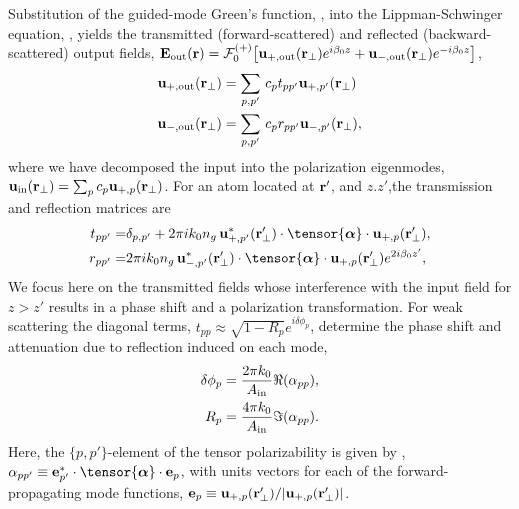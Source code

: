 \documentclass[preprint,aps,pra,onecolumn]{revtex4-1} %
\newcommand{\out}{{\rm out}}
\newcommand{\fwd}{+}
\newcommand{\bwd}{-}
\newcommand{\trans}{+}
\newcommand{\refl}{-}
\newcommand{\Eamp}{\mathcal{F}_0^{(+)}}
\begin{document}
Substitution of the guided-mode Green's function, , into the Lippman-Schwinger equation, , yields the transmitted (forward-scattered) and reflected (backward-scattered) output fields, $\mathbf{E}_{\out}(\br) = \Eamp \big[ \mathbf{u}_{\trans, \out} (\br_\perp) e^{i \beta_0 z} + \mathbf{u}_{\refl,\out} (\br_\perp) e^{-i \beta_0 z} \big]$, 
	\begin{align}
		\mathbf{u}_{\trans, \out} (\br_\perp) &=  \sum_{p,p'}  \, c_{p} t_{pp'} \mathbf{u}_{\fwd, p'}(\br_\perp) \\ 
		\mathbf{u}_{\refl,\out} (\br_\perp) &=  \sum_{p,p'}  \, c_{p} r_{pp'} \mathbf{u}_{\bwd, p'}(\br_\perp),
	\end{align}
where we have decomposed the input into the polarization eigenmodes, $\mbf{u}_{\rm in}(\mbf{r}_\perp) = \sum_{p} c_{p} \mathbf{u}_{\fwd,p}(\br_\perp)$.  For an atom located at $\mathbf{r}'$,  and $z.z'$,the transmission and reflection matrices are 
	\begin{align} \label{Eq::PolarizationTransformation}
		t_{pp'} =& \delta_{p,p'} +  2\pi i k_0 n_g \, \mathbf{u}^*_{+, p'}(\br'_\perp) \cdot 
\tensor{\boldsymbol{\alpha}} \cdot \mathbf{u}_{+, p}(\br'_\perp) , \\
		r_{pp'} =&  2\pi i k_0 n_g \, \mathbf{u}^*_{\bwd, p'}(\br'_\perp) \cdot 
\tensor{\boldsymbol{\alpha}} \cdot \mathbf{u}_{\fwd, p}(\br'_\perp) e^{2 i\beta_0 z'} , 
	\end{align} 
We focus here on the transmitted fields whose interference with the input field for $z>z'$ results in a phase shift and a polarization transformation.  For weak scattering the diagonal terms, $t_{p p} \approx \sqrt{1-R_p}e^{i \delta \phi_p}$, determine the phase shift and attenuation due to reflection induced on each mode,
	\begin{align}
		 \delta \phi_p &= \frac{2 \pi k_0}{A_{\rm in}} \Re(\alpha_{pp}),  \label{Eq::PhaseShift} \\
		R_p &=  \frac{4 \pi k_0}{A_{\rm in}} \Im(\alpha_{pp}) .\label{Eq::Attenuation} 
	\end{align} 
Here, the $\{p,p'\}$-element of the tensor polarizability is given by ,$\alpha_{pp'} \equiv \mathbf{e}^*_{p'} \cdot \tensor{\boldsymbol{\alpha}}\cdot \mathbf{e}_{p}$, with units vectors for each of the forward-propagating mode functions, $\mathbf{e}_{p}\equiv \mathbf{u}_{+,p}(\mathbf{r}'_\perp)/|\mathbf{u}_{+,p}(\mathbf{r}'_\perp)|$. 
\end{document}
